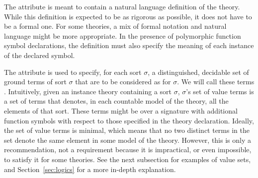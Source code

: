 The  attribute is meant to contain
a natural language definition of the theory.
While this definition is expected to be as rigorous as possible,
it does not have to be a formal one.
For some theories, 
a mix of formal notation and natural language might be more appropriate.
In the presence of polymorphic function symbol declarations,
the definition must also specify the meaning of each instance of the
declared symbol.

The attribute  is used to specify, for each sort $\sigma$, 
a distinguished, decidable set of ground terms of sort $\sigma$ 
that are to be considered as  for $\sigma$.
We will call these terms .
Intuitively, given an instance theory containing a sort $\sigma$,
$\sigma$'s set of value terms is a set of terms that denotes, 
in each countable model of the theory, all the elements of that sort.
These terms might be over a signature with additional function symbols 
with respect to those specified in the theory declaration.
Ideally, the set of value terms is minimal, which means that 
no two distinct terms in the set denote the same element in some model 
of the theory.
However, this is only a recommendation, not a requirement 
because it is impractical, or even impossible, to satisfy it 
for some theories.
%
See the next subsection for examples of value sets, and
Section~\ref{sec:logics} for a more in-depth explanation.


